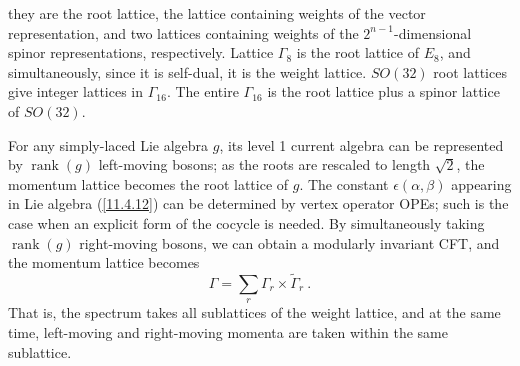 they are the root lattice, the lattice containing weights of the vector representation, and two lattices containing weights of the $2^{n-1}$-dimensional spinor representations, respectively. Lattice $\Gamma_{8}$ is the root lattice of $E_{8}$, and simultaneously, since it is self-dual, it is the weight lattice. $SO(32)$ root lattices give integer lattices in $\Gamma_{16}$. The entire $\Gamma_{16}$ is the root lattice plus a spinor lattice of $SO(32)$.

For any simply-laced Lie algebra $g$, its level 1 current algebra can be represented by $\operatorname{rank}(g)$ left-moving bosons; as the roots are rescaled to length $\sqrt{2}$, the momentum lattice becomes the root lattice of $g$. The constant $\epsilon(\alpha,\beta)$ appearing in Lie algebra (\ref{11.4.12}) can be determined by vertex operator OPEs; such is the case when an explicit form of the cocycle is needed. By simultaneously taking $\operatorname{rank}(g)$ right-moving bosons, we can obtain a modularly invariant CFT, and the momentum lattice becomes
\begin{equation}
	\Gamma=\sum_{r}\Gamma_{r}\times \tilde{\Gamma}_{r} \:. \label{11.6.10}
\end{equation}
That is, the spectrum takes all sublattices of the weight lattice, and at the same time, left-moving and right-moving momenta are taken within the same sublattice.
